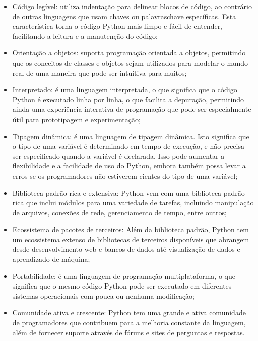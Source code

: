 \documentclass[letterpaper,10pt,english]{jupyterBook}
\begin{document}
\begin{itemize}
\item {} 
\sphinxAtStartPar
Código legível: utiliza indentação para delinear blocos de código, ao contrário de outras linguagens que usam chaves ou palavras\sphinxhyphen{}chave específicas. Esta característica torna o código Python mais limpo e fácil de entender, facilitando a leitura e a manutenção do código;

\item {} 
\sphinxAtStartPar
Orientação a objetos: suporta programação orientada a objetos, permitindo que os conceitos de classes e objetos sejam utilizados para modelar o mundo real de uma maneira que pode ser intuitiva para muitos;

\item {} 
\sphinxAtStartPar
Interpretado: é uma linguagem interpretada, o que significa que o código Python é executado linha por linha, o que facilita a depuração, permitindo ainda uma experiência interativa de programação que pode ser especialmente útil para prototipagem e experimentação;

\item {} 
\sphinxAtStartPar
Tipagem dinâmica: é uma linguagem de tipagem dinâmica. Isto significa que o tipo de uma variável é determinado em tempo de execução, e não precisa ser especificado quando a variável é declarada. Isso pode aumentar a flexibilidade e a facilidade de uso do Python, embora também possa levar a erros se os programadores não estiverem cientes do tipo de uma variável;

\item {} 
\sphinxAtStartPar
Biblioteca padrão rica e extensiva: Python vem com uma biblioteca padrão rica que inclui módulos para uma variedade de tarefas, incluindo manipulação de arquivos, conexões de rede, gerenciamento de tempo, entre outros;

\item {} 
\sphinxAtStartPar
Ecossistema de pacotes de terceiros: Além da biblioteca padrão, Python tem um ecossistema extenso de bibliotecas de terceiros disponíveis que abrangem desde desenvolvimento web e bancos de dados até visualização de dados e aprendizado de máquina;

\item {} 
\sphinxAtStartPar
Portabilidade: é uma linguagem de programação multiplataforma, o que significa que o mesmo código Python pode ser executado em diferentes sistemas operacionais com pouca ou nenhuma modificação;

\item {} 
\sphinxAtStartPar
Comunidade ativa e crescente: Python tem uma grande e ativa comunidade de programadores que contribuem para a melhoria constante da linguagem, além de fornecer suporte através de fóruns e sites de perguntas e respostas.

\end{itemize}
\end{document}
